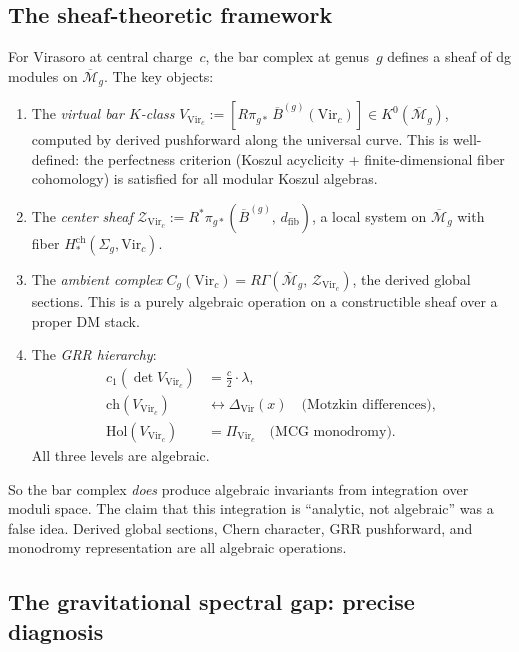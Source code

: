 \documentclass[11pt]{article}
\newcommand{\cM}{\mathcal{M}}
\newcommand{\cZ}{\mathcal{Z}}
\newcommand{\barB}{\overline{B}}
\begin{document}
\subsection{The sheaf-theoretic framework}

For Virasoro at central charge~$c$, the bar complex at
genus~$g$ defines a sheaf of dg modules on
$\overline{\cM}_g$.  The key objects:

\begin{enumerate}
\item The \emph{virtual bar $K$-class}
  $V_{\mathrm{Vir}_c} := [R\pi_{g*}\,\barB^{(g)}(\mathrm{Vir}_c)]
  \in K^0(\overline{\cM}_g)$, computed by derived pushforward
  along the universal curve.  This is well-defined: the
  perfectness criterion (Koszul acyclicity + finite-dimensional
  fiber cohomology) is satisfied for all modular Koszul algebras.

\item The \emph{center sheaf}
  $\cZ_{\mathrm{Vir}_c} := R^*\pi_{g*}(\barB^{(g)},\, d_{\mathrm{fib}})$,
  a local system on $\overline{\cM}_g$ with fiber
  $H^{\mathrm{ch}}_*(\Sigma_g, \mathrm{Vir}_c)$.

\item The \emph{ambient complex}
  $C_g(\mathrm{Vir}_c) = R\Gamma(\overline{\cM}_g,\,
  \cZ_{\mathrm{Vir}_c})$, the derived global sections.
  This is a purely algebraic operation on a constructible sheaf
  over a proper DM stack.

\item The \emph{GRR hierarchy}:
  \begin{align*}
  c_1(\det V_{\mathrm{Vir}_c}) &= \tfrac{c}{2} \cdot \lambda, \\
  \mathrm{ch}(V_{\mathrm{Vir}_c}) &\leftrightarrow \Delta_{\mathrm{Vir}}(x)
    \quad\text{(Motzkin differences)}, \\
  \mathrm{Hol}(V_{\mathrm{Vir}_c}) &= \Pi_{\mathrm{Vir}_c}
    \quad\text{(MCG monodromy)}.
  \end{align*}
  All three levels are algebraic.
\end{enumerate}

So the bar complex \emph{does} produce algebraic invariants
from integration over moduli space.  The claim that this
integration is ``analytic, not algebraic'' was a false idea.
Derived global sections, Chern character, GRR pushforward,
and monodromy representation are all algebraic operations.

\subsection{The gravitational spectral gap: precise diagnosis}
\end{document}
